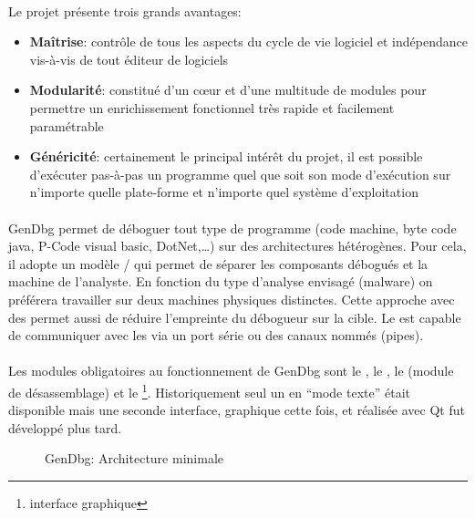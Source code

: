 \documentclass[11pt, book, english, french, standardlists]{upmethodology-document}
\begin{document}
					\paragraph*{}
						Le projet présente trois grands avantages:
						\begin{itemize}
							\item \textbf{Maîtrise}: contrôle de tous les aspects du cycle de vie logiciel et indépendance vis-à-vis de tout éditeur de logiciels
							\item \textbf{Modularité}: constitué d'un cœur et d'une multitude de modules pour permettre un enrichissement fonctionnel très rapide et facilement paramétrable
							\item \textbf{Généricité}: certainement le principal intérêt du projet, il est possible d'exécuter pas-à-pas un programme quel que soit son mode d'exécution sur n'importe quelle plate-forme et n'importe quel système d'exploitation
						\end{itemize}
					\paragraph*{}
						GenDbg permet de déboguer tout type de programme (code machine, byte code java, P-Code visual basic, DotNet,\ldots) sur des architectures hétérogènes. Pour cela, il adopte un modèle  /  qui permet de séparer les composants débogués et la machine de l'analyste. En fonction du type d'analyse envisagé (malware) on préférera travailler sur deux machines physiques distinctes. Cette approche avec des  permet aussi de réduire l'empreinte du débogueur sur la cible. Le  est capable de communiquer avec les  via un port série ou des canaux nommés (pipes).
					\paragraph*{}
						Les modules obligatoires au fonctionnement de GenDbg sont le , le , le  (module de désassemblage) et le \footnote{interface graphique}. Historiquement seul un  en ``mode texte'' était disponible mais une seconde interface, graphique cette fois, et réalisée avec Qt fut développé plus tard.
					\begin{figure}[H]
						\centering
						\caption{GenDbg: Architecture minimale}
						\label{fig:GenDbg_architecture_minimale}
					\end{figure}
\end{document}

